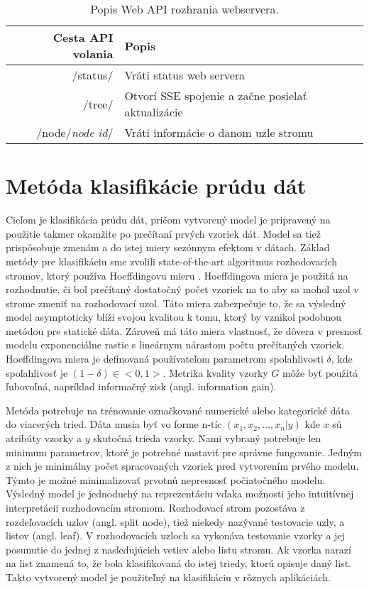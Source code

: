 \begin{table}[!htp]
\centering
\begin{tabular}{|r|l|}
\hline
\textbf{Cesta API volania} & \textbf{Popis} \\ \hline
/status/ & Vráti status web servera \\ \hline
/tree/ & Otvorí SSE spojenie a začne posielať aktualizácie \\ \hline
/node/\textit{node id}/ & Vráti informácie o danom uzle stromu \\ \hline
\end{tabular}
\caption{Popis Web API rozhrania webservera.}
\label{tab-web-api}
\end{table}

\section{Metóda klasifikácie prúdu dát}
\label{method-klasifikacia-prudu-dat}
Cieľom je klasifikácia prúdu dát, pričom vytvorený model je pripravený na použitie takmer okamžite po prečítaní prvých vzoriek dát. Model sa tiež prispôsobuje zmenám a do istej miery sezónnym efektom v dátach. Základ metódy pre klasifikáciu sme zvolili state-of-the-art algoritmus rozhodovacích stromov, ktorý používa Hoeffdingovu mieru \citep{domingos2000mining, gaber2005mining, krempl2014open}. Hoeffdingova miera je použitá na rozhodnutie, či bol prečítaný dostatočný počet vzoriek na to aby sa mohol uzol v strome zmeniť na rozhodovací uzol. Táto miera zabezpečuje to, že sa výsledný model asymptoticky blíži svojou kvalitou k tomu, ktorý by vznikol podobnou metódou pre statické dáta. Zároveň má táto miera vlastnosť, že  dôvera v presnosť modelu exponenciálne rastie s lineárnym nárastom počtu prečítaných vzoriek. Hoeffdingova miera je definovaná používateľom parametrom spoľahlivosti $\delta$, kde spoľahlivosť je $(1-\delta) \in <0,1>$. Metrika kvality vzorky $G$ môže byť použitá ľubovoľná, napríklad informačný zisk (angl. information gain).
\par
Metóda potrebuje na trénovanie označkované numerické alebo kategorické dáta do viacerých tried. Dáta musia byť vo forme n-tíc $(x_1, x_2, ..., x_n | y)$ kde $x$ sú atribúty vzorky a $y$ skutočná trieda vzorky. Nami vybraný potrebuje len minimum parametrov, ktoré je potrebné nastaviť pre správne fungovanie. Jedným z nich je minimálny počet spracovaných vzoriek pred vytvorením prvého modelu. Týmto je možné minimalizovať prvotnú nepresnosť počiatočného modelu. Výsledný model je jednoduchý na reprezentáciu vďaka možnosti jeho intuitívnej interpretácii rozhodovacím stromom. Rozhodovací strom pozostáva z rozdeľovacích uzlov (angl. split node), tiež niekedy nazývané testovacie uzly, a listov (angl. leaf). V rozhodovacích uzloch sa vykonáva testovanie vzorky a jej posunutie do jednej z nasledujúcich vetiev alebo listu stromu. Ak vzorka narazí na list znamená to, že bola klasifikovaná do istej triedy, ktorú opisuje daný list. Takto vytvorený model je použiteľný na klasifikáciu v rôznych aplikáciách.

